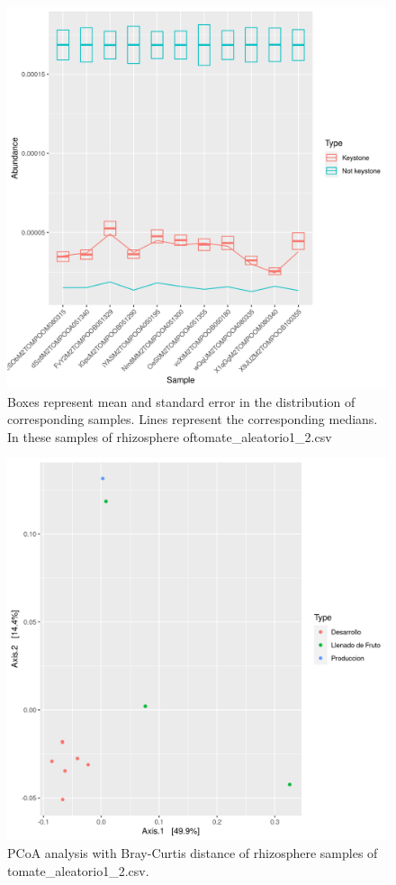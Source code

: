 \begin{figure}
 \centering
 \includegraphics[scale = 0.75]{mean_median_key_vs_not_key_tomate_aleatorio1_2.csv.png}
\caption{Boxes represent mean and standard error in the distribution of corresponding samples. Lines represent the corresponding medians. In these samples of rhizosphere oftomate_aleatorio1_2.csv}
\label{mean_median_tomate_aleatorio1_2.csv}
\end{figure}
\begin{figure}
   \centering
   \includegraphics[scale = 0.7]{pcoa_muestras_tomate_aleatorio1_2.csv.png}
 \caption{PCoA analysis with Bray-Curtis distance of rhizosphere samples of tomate_aleatorio1_2.csv.}
 \label{fig:tomate_aleatorio1_2.csv_pcoa}
\end{figure}
